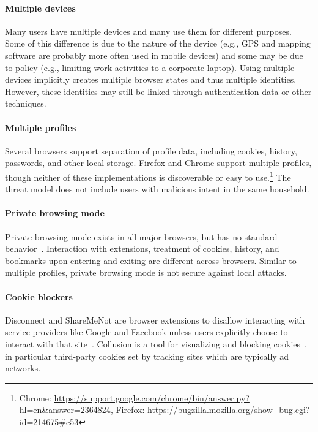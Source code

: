 \documentclass[10pt, conference, compsocconf]{IEEEtran}
\begin{document}
\paragraph{Multiple devices}

Many users have multiple devices and many use them for different purposes.
Some of this difference is due to the nature of the device (e.g.,
GPS and mapping software are probably more often used in mobile devices) and
some may be due to policy (e.g., limiting work activities to a corporate
laptop). Using multiple devices implicitly creates multiple browser states and
thus multiple identities.  However, these identities may still be linked
through authentication data or other techniques.%

\paragraph{Multiple profiles}

Several browsers support separation of profile data, including cookies,
history, passwords, and other local storage. Firefox 
and Chrome support multiple profiles, though neither of these implementations
is discoverable or easy to use.\footnote{Chrome:
\url{https://support.google.com/chrome/bin/answer.py?hl=en&answer=2364824},
Firefox: \url{https://bugzilla.mozilla.org/show\_bug.cgi?id=214675\#c53}} The
threat model does not include users with malicious intent in the same
household.

\paragraph{Private browsing mode}
Private browsing mode exists in all major browsers, but has no standard
behavior~\cite{ABBJ10}.
Interaction with extensions, treatment of cookies, history, and
bookmarks upon entering and exiting are different across browsers.
Similar to multiple profiles, private browsing mode is not secure against local
attacks.

\paragraph{Cookie blockers}
Disconnect and ShareMeNot are browser extensions to disallow interacting with
service providers like Google and Facebook unless users explicitly choose to
interact with that site~\cite{disconnect,franzi}.  Collusion is a tool for
visualizing and blocking cookies~\cite{collusion}, in particular third-party
cookies set by tracking sites which are typically ad networks.
\end{document}
